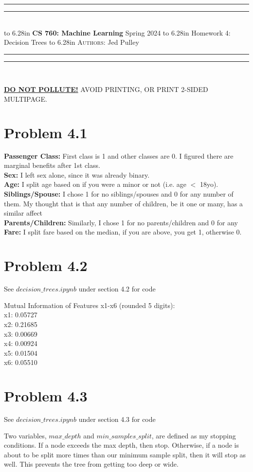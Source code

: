 \documentclass{article}
\newcommand{\lecture}[2]{
\pagestyle{myheadings}
\thispagestyle{plain}
\newpage
\noindent
\begin{center}
\rule{\textwidth}{1.6pt}\vspace*{-\baselineskip}\vspace*{2pt} %
\rule{\textwidth}{0.4pt}\\[1\baselineskip] %
\vbox{\vspace{2mm}
\hbox to 6.28in { {\bf CS 760: Machine Learning} \hfill Spring 2024 }
\vspace{4mm}
\hbox to 6.28in { {\Large \hfill #1  \hfill} }
\vspace{4mm}
\hbox to 6.28in { {\scshape Authors:}  #2 \hfill }}
\vspace{-2mm}
\rule{\textwidth}{0.4pt}\vspace*{-\baselineskip}\vspace{3.2pt} %
\rule{\textwidth}{1.6pt}\\[\baselineskip] %
\end{center}
\vspace*{4mm}
}
\begin{document}
\lecture{Homework 4: Decision Trees}{Jed Pulley}

\begin{center}
{\Large {\sf \underline{\textbf{DO NOT POLLUTE!}} AVOID PRINTING, OR PRINT 2-SIDED MULTIPAGE.}}
\end{center}

\section*{Problem 4.1}
\textbf{Passenger Class:} First class is 1 and other classes are 0. I figured there are marginal benefits after 1st class. \\
\textbf{Sex:} I left sex alone, since it was already binary. \\
\textbf{Age:} I split age based on if you were a minor or not (i.e. age $<$ 18yo). \\
\textbf{Siblings/Spouse:} I chose 1 for no siblings/spouses and 0 for any number of them. My thought that is that any number of children, be it one or many, has a similar affect \\
\textbf{Parents/Children:} Similarly, I chose 1 for no parents/children and 0 for any \\
\textbf{Fare:} I split fare based on the median, if you are above, you get 1, otherwise 0.

\section*{Problem 4.2}
See $decision\_trees.ipynb$ under section 4.2 for code

Mutual Information of Features x1-x6 (rounded 5 digits): \\
x1: 0.05727 \\
x2: 0.21685 \\
x3: 0.00669 \\
x4: 0.00924 \\
x5: 0.01504 \\
x6: 0.05510

\section*{Problem 4.3}
See $decision\_trees.ipynb$ under section 4.3 for code

Two variables, $max\_depth$ and $min\_samples\_split$, are defined as my  stopping conditions. If a node exceeds the max depth, then stop. Otherwise, if a node is about to be split more times than our minimum sample split, then it will stop as well. This prevents the tree from getting too deep or wide.
\end{document}
